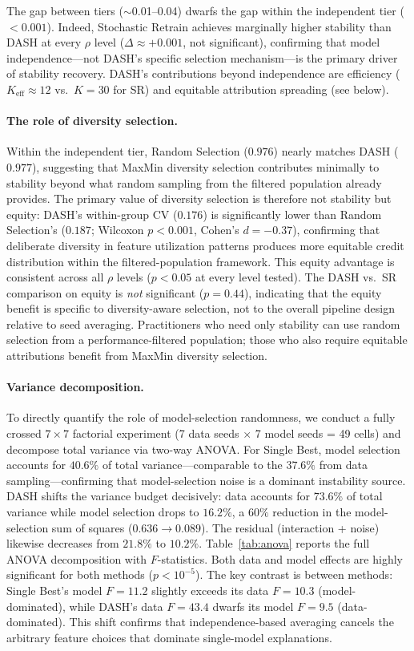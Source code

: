 \documentclass[11pt]{article}
\newcommand{\dash}{\textsc{DASH}}
\newcommand{\rhovar}{\rho}
\begin{document}
The gap between tiers ($\sim$0.01--0.04) dwarfs the gap within the
independent tier ($< 0.001$). Indeed, Stochastic Retrain achieves
marginally higher stability than \dash{} at every $\rhovar$ level
($\Delta \approx +0.001$, not significant), confirming that model
independence---not \dash{}'s specific selection mechanism---is the
primary driver of stability recovery. \dash{}'s contributions beyond
independence are efficiency ($K_{\text{eff}} \approx 12$ vs.\ $K = 30$
for SR) and equitable attribution spreading (see below).

\paragraph{The role of diversity selection.}
Within the independent tier, Random Selection ($0.976$) nearly matches
\dash{} ($0.977$), suggesting that MaxMin diversity selection contributes
minimally to stability beyond what random sampling from the filtered
population already provides. The primary value of diversity selection
is therefore not stability but equity: \dash{}'s within-group CV
($0.176$) is significantly lower than Random Selection's ($0.187$;
Wilcoxon $p < 0.001$, Cohen's $d = -0.37$), confirming that deliberate
diversity in feature utilization patterns produces more equitable credit
distribution within the filtered-population framework. This equity
advantage is consistent across all $\rhovar$ levels ($p < 0.05$ at
every level tested). The \dash{} vs.\ SR comparison on equity is
\emph{not} significant ($p = 0.44$), indicating that the equity benefit
is specific to diversity-aware selection, not to the overall pipeline
design relative to seed averaging. Practitioners who need only stability
can use random selection from a performance-filtered population;
those who also require equitable attributions benefit from MaxMin
diversity selection.

\paragraph{Variance decomposition.}
To directly quantify the role of model-selection randomness, we conduct
a fully crossed $7 \times 7$ factorial experiment (7 data seeds $\times$
7 model seeds = 49 cells) and decompose total variance via two-way
ANOVA. For Single Best, model selection accounts for $40.6\%$ of total
variance---comparable to the $37.6\%$ from data sampling---confirming
that model-selection noise is a dominant instability source. \dash{}
shifts the variance budget decisively: data accounts for $73.6\%$ of
total variance while model selection drops to $16.2\%$, a $60\%$
reduction in the model-selection sum of squares ($0.636 \to 0.089$).
The residual (interaction + noise) likewise decreases from $21.8\%$ to
$10.2\%$. Table~\ref{tab:anova} reports the full ANOVA decomposition
with $F$-statistics. Both data and model effects are highly significant
for both methods ($p < 10^{-5}$). The key contrast is between methods:
Single Best's model $F = 11.2$ slightly exceeds its data $F = 10.3$
(model-dominated), while \dash{}'s data $F = 43.4$ dwarfs its model
$F = 9.5$ (data-dominated). This shift confirms that
independence-based averaging cancels the arbitrary feature choices that
dominate single-model explanations.
\end{document}
